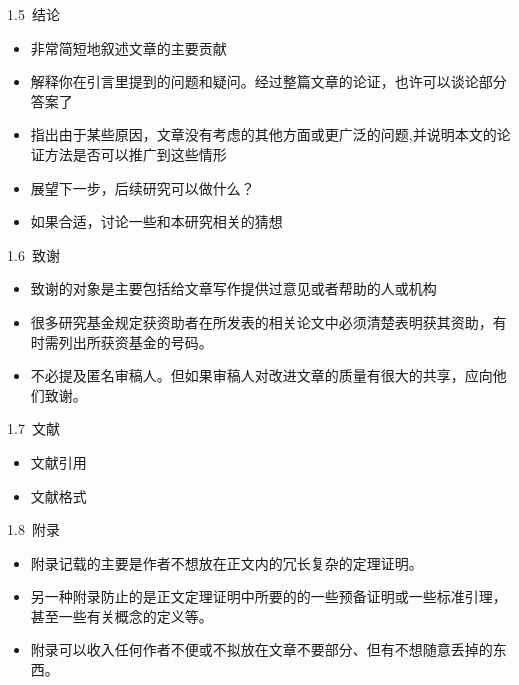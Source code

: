 \documentclass[13pt,fontset=mac]{ctexbeamer}
\begin{document}
\begin{frame}{1.5~结论}
	
	\begin{itemize}
		\item  非常简短地叙述文章的主要贡献
		\item  解释你在引言里提到的问题和疑问。经过整篇文章的论证，也许可以谈论部分答案了
		\item 指出由于某些原因，文章没有考虑的其他方面或更广泛的问题,并说明本文的论证方法是否可以推广到这些情形
		\item  展望下一步，后续研究可以做什么？
		\item 如果合适，讨论一些和本研究相关的猜想
	\end{itemize}
\end{frame}


\begin{frame}{1.6~致谢}
	
	\begin{itemize}
		\item  致谢的对象是主要包括给文章写作提供过意见或者帮助的人或机构
		\item  很多研究基金规定获资助者在所发表的\alert{相关}论文中必须清楚表明获其资助，有时需列出所获资基金的号码。
		\item 不必提及匿名审稿人。但如果审稿人对改进文章的质量有很大的共享，应向他们致谢。
	\end{itemize}
\end{frame}


\begin{frame}{1.7~文献}
	
	\begin{itemize}
		\item  文献引用
		\item  文献格式
	\end{itemize}
\end{frame}


\begin{frame}{1.8~附录}
	
	\begin{itemize}
		\item  附录记载的主要是作者不想放在正文内的冗长复杂的定理证明。
		\item  另一种附录防止的是正文定理证明中所要的的一些预备证明或一些标准引理，甚至一些有关概念的定义等。
		\item 附录可以收入任何作者不便或不拟放在文章不要部分、但有不想随意丢掉的东西。
	\end{itemize}
\end{frame}
\end{document}

